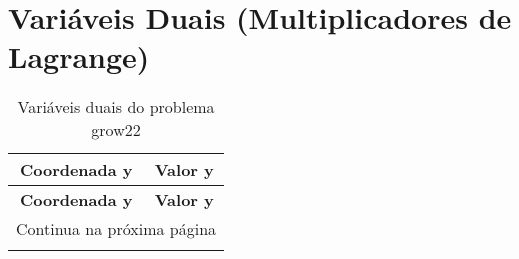 \documentclass[12pt]{article}
\begin{document}
\section{Variáveis Duais (Multiplicadores de Lagrange)}

\begin{longtable}{@{}cc@{}}
\caption{Variáveis duais do problema grow22} \\
\toprule
\textbf{Coordenada y} & \textbf{Valor y} \\
\midrule
\endfirsthead

\toprule
\textbf{Coordenada y} & \textbf{Valor y} \\
\midrule
\endhead

\midrule \multicolumn{2}{r}{{Continua na próxima página}} \\ \midrule
\endfoot


\end{longtable}
\end{document}
